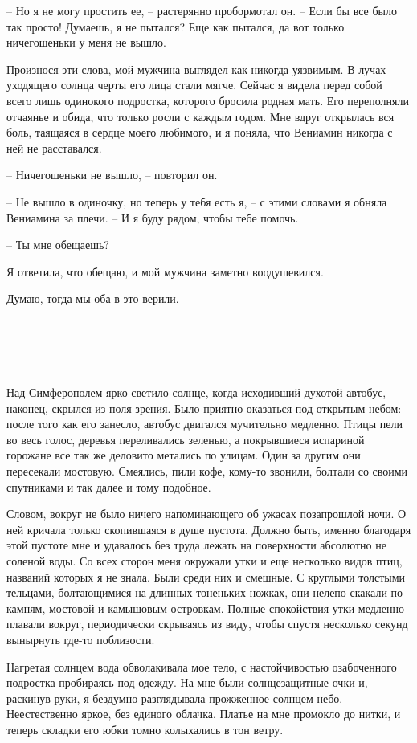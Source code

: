 \documentclass[
]{book}
\begin{document}
-- Но я не могу простить ее, -- растерянно пробормотал он. -- Если бы все было так просто! Думаешь, я не пытался? Еще как пытался, да вот только ничегошеньки у меня не вышло.

Произнося эти слова, мой мужчина выглядел как никогда уязвимым. В лучах уходящего солнца черты его лица стали мягче. Сейчас я видела перед собой всего лишь одинокого подростка, которого бросила родная мать. Его переполняли отчаянье и обида, что только росли с каждым годом. Мне вдруг открылась вся боль, таящаяся в сердце моего любимого, и я поняла, что Вениамин никогда с ней не расставался.

-- Ничегошеньки не вышло, -- повторил он.

-- Не вышло в одиночку, но теперь у тебя есть я, -- с этими словами я обняла Вениамина за плечи. -- И я буду рядом, чтобы тебе помочь.

-- Ты мне обещаешь?

Я ответила, что обещаю, и мой мужчина заметно воодушевился.

Думаю, тогда мы оба в это верили.

\hypertarget{chapter-61}{%
\chapter{~}\label{chapter-61}}

Над Симферополем ярко светило солнце, когда исходивший духотой автобус, наконец, скрылся из поля зрения. Было приятно оказаться под открытым небом: после того как его занесло, автобус двигался мучительно медленно. Птицы пели во весь голос, деревья переливались зеленью, а покрывшиеся испариной горожане все так же деловито метались по улицам. Один за другим они пересекали мостовую. Смеялись, пили кофе, кому-то звонили, болтали со своими спутниками и так далее и тому подобное.

Словом, вокруг не было ничего напоминающего об ужасах позапрошлой ночи. О ней кричала только скопившаяся в душе пустота. Должно быть, именно благодаря этой пустоте мне и удавалось без труда лежать на поверхности абсолютно не соленой воды. Со всех сторон меня окружали утки и еще несколько видов птиц, названий которых я не знала. Были среди них и смешные. С круглыми толстыми тельцами, болтающимися на длинных тоненьких ножках, они нелепо скакали по камням, мостовой и камышовым островкам. Полные спокойствия утки медленно плавали вокруг, периодически скрываясь из виду, чтобы спустя несколько секунд вынырнуть где-то поблизости.

Нагретая солнцем вода обволакивала мое тело, с настойчивостью озабоченного подростка пробираясь под одежду. На мне были солнцезащитные очки и, раскинув руки, я бездумно разглядывала прожженное солнцем небо. Неестественно яркое, без единого облачка. Платье на мне промокло до нитки, и теперь складки его юбки томно колыхались в тон ветру.
\end{document}
